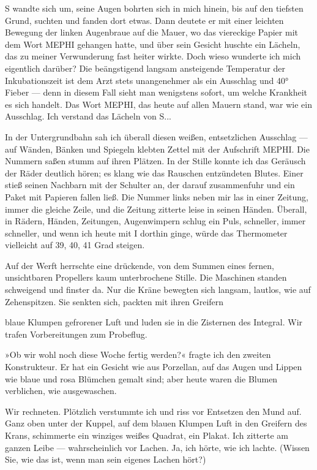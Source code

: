 S wandte sich um, seine Augen bohrten sich in mich hinein, bis auf
den tiefsten Grund, suchten und fanden dort etwas. Dann deutete er
mit einer leichten Bewegung der linken Augenbraue auf die Mauer, wo
das viereckige Papier mit dem Wort MEPHI gehangen hatte, und über
sein Gesicht huschte ein Lächeln, das zu meiner Verwunderung fast
heiter wirkte. Doch wieso wunderte ich mich eigentlich darüber? Die
beängstigend langsam ansteigende Temperatur der Inkubationszeit ist
dem Arzt stets unangenehmer als ein Ausschlag und 40° Fieber — denn
in diesem Fall sieht man wenigstens sofort, um welche Krankheit es
sich handelt. Das Wort MEPHI, das heute auf allen Mauern stand, war
wie ein Ausschlag. Ich verstand das Lächeln von S...

In der Untergrundbahn sah ich überall diesen weißen, entsetzlichen
Ausschlag — auf Wänden, Bänken und Spiegeln klebten Zettel mit der
Aufschrift MEPHI. Die Nummern saßen stumm auf ihren Plätzen. In der
Stille konnte ich das Geräusch der Räder deutlich hören; es klang
wie das Rauschen entzündeten Blutes. Einer stieß seinen Nachbarn
mit der Schulter an, der darauf zusammenfuhr und ein Paket mit
Papieren fallen ließ. Die Nummer links neben mir las in einer
Zeitung, immer die gleiche Zeile, und die Zeitung zitterte leise in
seinen Händen. Überall, in Rädern, Händen, Zeitungen, Augenwimpern
schlug ein Puls, schneller, immer schneller, und wenn ich heute mit
I dorthin ginge, würde das Thermometer vielleicht auf 39, 40, 41
Grad steigen.

Auf der Werft herrschte eine drückende, von dem Summen eines
fernen, unsichtbaren Propellers kaum unterbrochene Stille. Die
Maschinen standen schweigend und finster da. Nur die Kräne bewegten
sich langsam, lautlos, wie auf Zehenspitzen. Sie senkten sich,
packten mit ihren Greifern

blaue Klumpen gefrorener Luft und luden sie in die Zisternen des
Integral. Wir trafen Vorbereitungen zum Probeflug.

»Ob wir wohl noch diese Woche fertig werden?« fragte ich den
zweiten Konstrukteur. Er hat ein Gesicht wie aus Porzellan, auf das
Augen und Lippen wie blaue und rosa Blümchen gemalt sind; aber
heute waren die Blumen verblichen, wie ausgewaschen.

Wir rechneten. Plötzlich verstummte ich und riss vor Entsetzen den
Mund auf. Ganz oben unter der Kuppel, auf dem blauen Klumpen Luft
in den Greifern des Krans, schimmerte ein winziges weißes Quadrat,
ein Plakat. Ich zitterte am ganzen Leibe — wahrscheinlich vor
Lachen. Ja, ich hörte, wie ich lachte. (Wissen Sie, wie das ist,
wenn man sein eigenes Lachen hört?)

